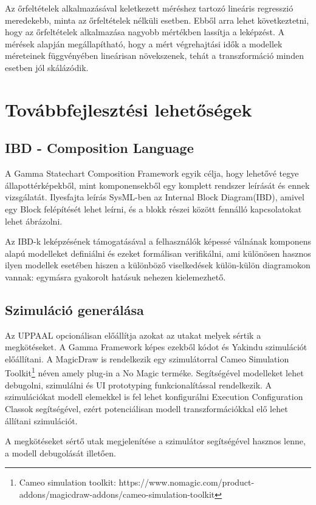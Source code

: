 Az őrfeltételek alkalmazásával keletkezett méréshez tartozó lineáris regresszió meredekebb, minta az őrfeltételek nélküli esetben. Ebből arra lehet következtetni, hogy az őrfeltételek alkalmazása nagyobb mértékben lassítja a leképzést. A mérések alapján megállapítható, hogy a mért végrehajtási idők a modellek méreteinek függvényében lineárisan növekszenek, tehát a transzformáció minden esetben jól skálázódik.

\clearpage\section{Továbbfejlesztési lehetőségek}
\label{sec:jovoben}
\subsection{IBD - Composition Language}
A Gamma Statechart Composition Framework egyik célja, hogy lehetővé tegye állapottérképekből, mint komponensekből egy komplett rendszer leírását és ennek vizsgálatát. Ilyesfajta leírás SysML-ben az Internal Block Diagram(IBD), amivel egy Block felépítését lehet leírni, és a blokk részei között fennálló kapcsolatokat lehet ábrázolni.

Az IBD-k leképzésének támogatásával a felhasználók képessé válnának komponens alapú modelleket definiálni és ezeket formálisan verifikálni, ami különösen hasznos ilyen modellek esetében hiszen a különböző viselkedések külön-külön diagramokon vannak: egymásra gyakorolt hatásuk nehezen kielemezhető.

\subsection{Szimuláció generálása}

Az UPPAAL opcionálisan előállítja azokat az utakat melyek sértik a megkötéseket. A Gamma Framework képes ezekből kódot és Yakindu szimulációt előállítani. A MagicDraw is rendelkezik egy szimulátorral Cameo Simulation Toolkit\footnote{Cameo simulation toolkit: https://www.nomagic.com/product-addons/magicdraw-addons/cameo-simulation-toolkit} néven amely plug-in a No Magic terméke. Segítségével modelleket lehet debugolni, szimulálni és UI prototyping funkcionalítással rendelkezik. A szimulációkat modell elemekkel is fel lehet konfigurálni Execution Configuration Classok segítségével, ezért potenciálisan modell transzformációkkal elő lehet állítani szimulációt.

A megkötéseket sértő utak megjelenítése a szimulátor segítségével hasznos lenne, a modell debugolását illetően.

